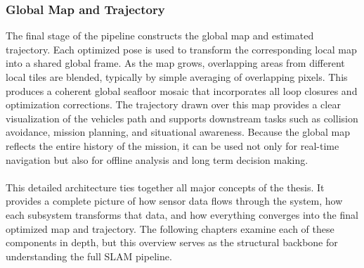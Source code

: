 \subsubsection{Global Map and Trajectory}
The final stage of the pipeline constructs the global map and estimated trajectory. Each optimized pose is used to transform the corresponding local map into a shared global frame. As the map grows, overlapping areas from different local tiles are blended, typically by simple averaging of overlapping pixels. This produces a coherent global seafloor mosaic that incorporates all loop closures and optimization corrections. The trajectory drawn over this map provides a clear visualization of the vehicles path and supports downstream tasks such as collision avoidance, mission planning, and situational awareness. Because the global map reflects the entire history of the mission, it can be used not only for real-time navigation but also for offline analysis and long term decision making.
\\ \\
This detailed architecture ties together all major concepts of the thesis. It provides a complete picture of how sensor data flows through the system, how each subsystem transforms that data, and how everything converges into the final optimized map and trajectory. The following chapters examine each of these components in depth, but this overview serves as the structural backbone for understanding the full SLAM pipeline.
